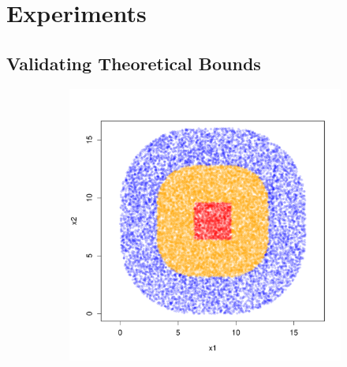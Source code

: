 \documentclass{article}
\newcommand{\1}{\mathbf{1}}
\theoremstyle{aldenthm}
\theoremstyle{aldenrmrk}
\begin{document}
\section{Experiments}
\label{sec: experiments}

\subsection{Validating Theoretical Bounds}

\begin{figure}
	\centering
	\begin{adjustbox}{minipage=\linewidth,scale=0.8}
	\begin{subfigure}{.33\linewidth}
		\includegraphics[width=\linewidth]{example1plots/sample2}
		\caption{}
	\end{subfigure}
	\begin{subfigure}{.33\linewidth}

\end{subfigure}
\end{adjustbox}
\end{figure}
\end{document}
